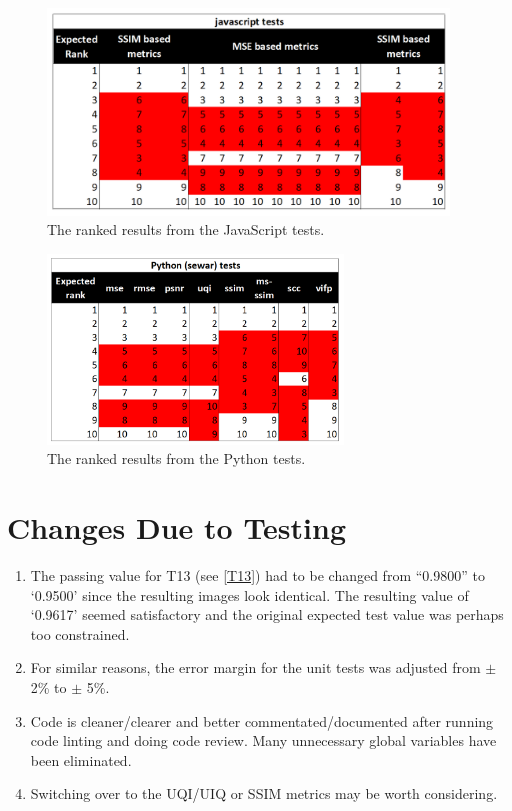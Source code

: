 \documentclass[12pt, titlepage]{article}
\begin{document}
\begin{figure}[h!]
  \begin{center}
  \includegraphics[width=0.95\textwidth]{test-analysis/js-ranked.png}
  \caption{The ranked results from the JavaScript tests.}
  \label{fig_js_ranks}
  \end{center}
\end{figure}

\begin{figure}[h!]
  \begin{center}
  \includegraphics[width=0.7\textwidth]{test-analysis/py-ranked.png}
  \caption{The ranked results from the Python tests.}
  \label{fig_py_ranks}
  \end{center}
\end{figure}


\newpage
\clearpage

\section{Changes Due to Testing}
\begin{enumerate}
  \item The passing value for T13 (see \ref{T13}) had to be changed from ``0.9800'' to `0.9500' since the
    resulting images look identical. The resulting value of `0.9617' seemed satisfactory and the original
    expected test value was perhaps too constrained.
  \item For similar reasons, the error margin for the unit tests was adjusted from $\pm$ 2\% to $\pm$ 5\%.
  \item Code is cleaner/clearer and better commentated/documented after running code linting and
    doing code review. Many unnecessary global variables have been eliminated.
  \item Switching over to the UQI/UIQ or SSIM metrics may be worth considering.
\end{enumerate}
\end{document}
